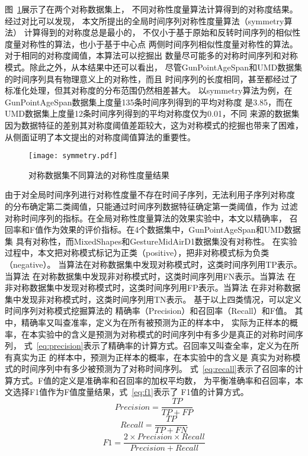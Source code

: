 图~\ref{fig:symmetry_compare}展示了在两个对称数据集上，
不同对称性度量算法计算得到的对称度结果。经过对比可以发现，
本文所提出的全局时间序列对称性度量算法（symmetry算法）
计算得到的对称度总是最小的，
不仅小于基于原始和反转时间序列的相似性度量对称性的算法，也小于基于中心点
两侧时间序列相似性度量对称性的算法。对于相同的对称度阈值，本算法可以挖掘出
数量尽可能多的对称时间序列和对称模式。除此之外，从本结果中还可以看出，
尽管GunPointAgeSpan和UMD数据集的时间序列具有物理意义上的对称性，而且
时间序列的长度相同，甚至都经过了标准化处理，但其对称度的分布范围仍然相差甚大。
以symmetry算法为例，在GunPointAgeSpan数据集上度量135条时间序列得到的平均对称度
是3.85，而在UMD数据集上度量12条时间序列得到的平均对称度仅为0.01，不同
来源的数据集因为数据特征的差别其对称度阈值差距较大，这为对称模式的挖掘也带来了困难，
从侧面证明了本文提出的对称度阈值算法的重要性。
\begin{figure}
  \centering
  \texttt{[image: symmetry.pdf]}
  \caption{对称数据集不同算法的对称性度量结果}
  \label{fig:symmetry_compare}
\end{figure}

由于对全局时间序列进行对称性度量不存在时间子序列，无法利用子序列对称度
的分布确定第二类阈值，只能通过时间序列数据特征确定第一类阈值，作为
过滤对称时间序列的指标。在全局对称性度量算法的效果实验中，本文以精确率，
召回率和F值作为效果的评价指标。在4个数据集中，GunPointAgeSpan和UMD数据集
具有对称性，而MixedShapes和GestureMidAirD1数据集没有对称性。
在实验过程中，本文把对称模式标记为正类（positive），把非对称模式标为负类（negative）。
当算法在对称数据集中发现对称模式时，这类时间序列用TP表示。当算法
在对称数据集中发现非对称模式时，这类时间序列用FN表示。当算法
在非对称数据集中发现对称模式时，这类时间序列用FP表示。当算法
在非对称数据集中发现非对称模式时，这类时间序列用TN表示。
基于以上四类情况，可以定义时间序列对称模式挖掘算法的
精确率（Precision）和召回率（Recall）和F值。
其中，精确率又叫查准率，定义为在所有被预测为正的样本中，
实际为正样本的概率，在本实验中的含义是预测为对称模式的时间序列中有多少是真正的对称时间序列，
式~\ref{eq:precision}表示了精确率的计算方式。召回率又叫查全率，定义为在所有真实为正
的样本中，预测为正样本的概率，在本实验中的含义是
真实为对称模式的时间序列中有多少被预测为了对称时间序列。
式~\ref{eq:recall}表示了召回率的计算方式。F值的定义是准确率和召回率的加权平均数，
为平衡准确率和召回率，本文选择F1值作为F值度量结果，式~\ref{eq:f1}表示了
F1值的计算方式。
\begin{equation}
  Precision=\frac{TP}{TP+FP}
  \label{eq:precision}
\end{equation}
\begin{equation}
  Recall=\frac{TP}{TP+FN}
  \label{eq:recall}
\end{equation}
\begin{equation}
  F1=\frac{2 \times Precision \times Recall}{Precision+Recall}
  \label{eq:f1}
\end{equation}

